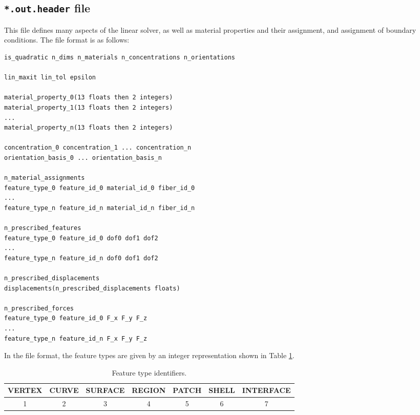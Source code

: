 \documentclass[]{article}
\begin{document}
\cprotect\subsection{\verb=*.out.header= file}\label{sec:format:header}
This file defines many aspects of the linear solver, as well as
material properties and their assignment, and assignment of boundary
conditions. The file format is as follows:
\begin{center}
  \begin{minipage}{0.9\textwidth}
\begin{lstlisting}
is_quadratic n_dims n_materials n_concentrations n_orientations

lin_maxit lin_tol epsilon

material_property_0(13 floats then 2 integers)
material_property_1(13 floats then 2 integers)
...
material_property_n(13 floats then 2 integers)

concentration_0 concentration_1 ... concentration_n
orientation_basis_0 ... orientation_basis_n

n_material_assignments
feature_type_0 feature_id_0 material_id_0 fiber_id_0
...
feature_type_n feature_id_n material_id_n fiber_id_n

n_prescribed_features
feature_type_0 feature_id_0 dof0 dof1 dof2
...
feature_type_n feature_id_n dof0 dof1 dof2

n_prescribed_displacements
displacements(n_prescribed_displacements floats)

n_prescribed_forces
feature_type_0 feature_id_0 F_x F_y F_z
...
feature_type_n feature_id_n F_x F_y F_z
\end{lstlisting}
  \end{minipage}
\end{center}
In the file format, the feature types are given by an integer
representation shown in Table \ref{tab:type_map}.
\begin{table}[htb]
\centering
\caption{Feature type identifiers.}\label{tab:type_map}
\begin{tabular}{ccccccc}
\toprule
VERTEX&CURVE&SURFACE&REGION&PATCH&SHELL&INTERFACE\\
\midrule
1&2&3&4&5&6&7\\
\bottomrule
\end{tabular}
\end{table}
\end{document}
